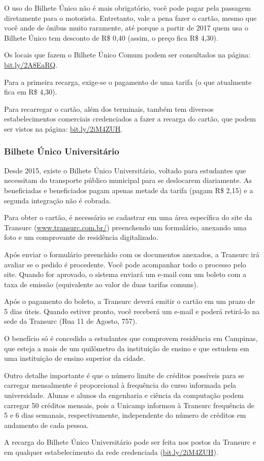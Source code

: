 O uso do Bilhete Único não é mais obrigatório, você pode pagar pela passagem
diretamente para o motorista. Entretanto, vale a pena fazer o cartão, mesmo
que você ande de ônibus muito raramente, até porque a partir de 2017 quem
usa o Bilhete Único tem desconto de R\$ 0,40 (assim, o preço fica R\$ 4,30).

Os locais que fazem o Bilhete Único Comum podem ser consultados na página:
\url{bit.ly/2A8EaRQ}.

Para a primeira recarga, exige-se o pagamento de uma tarifa (o que atualmente
fica em R\$ 4,30).

Para recarregar o cartão, além dos terminais, também tem diversos
estabelecimentos comerciais credenciados a fazer a recarga do cartão, que podem
ser vistos na página: \url{bit.ly/2iM4ZUH}.

\subsubsection{Bilhete Único Universitário}

Desde 2015, existe o Bilhete Único Universitário, voltado para estudantes que
necessitam do transporte público municipal para se deslocarem diariamente. As
beneficiadas e beneficiados pagam apenas metade da tarifa (pagam R\$ 2,15) e a
segunda integração não é cobrada.

Para obter o cartão, é necessário se cadastrar em uma área específica do site
da Transurc (\url{www.transurc.com.br/}) preenchendo um formulário, anexando
uma foto e um comprovante de residência digitalizado.

Após enviar o formulário preenchido com os documentos anexados, a Transurc
irá avaliar se o pedido é procedente. Você pode acompanhar todo o processo pelo
site. Quando for aprovado, o sistema enviará um e-mail com um boleto com a taxa
de emissão (equivalente ao valor de duas tarifas comuns).

Após o pagamento do boleto, a Transurc deverá emitir o cartão em um prazo de
5 dias úteis. Quando estiver pronto, você receberá um e-mail e poderá retirá-lo
na sede da Transurc (Rua 11 de Agosto, 757).

O benefício só é concedido a estudantes que comprovem residência em Campinas,
que esteja a mais de um quilômetro da instituição de ensino e que estudem em
uma instituição de ensino superior da cidade.

Outro detalhe importante é que o número limite de créditos possíveis para se
carregar mensalmente é proporcional à frequência do curso informada pela
universidade. Alunas e alunos da engenharia e ciência da computação podem
carregar 50 créditos mensais, pois a Unicamp informou à Transurc frequência de
5 e 6 dias semanais, respectivamente, independente do número de créditos em
andamento de cada pessoa.

A recarga do Bilhete Único Universitário pode ser feita nos postos da Transurc
e em qualquer estabelecimento da rede credenciada (\url{bit.ly/2iM4ZUH}).
